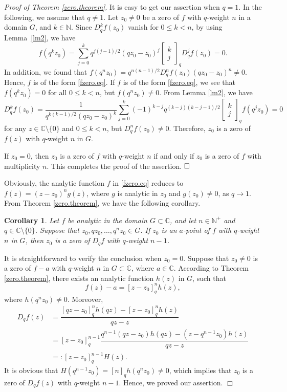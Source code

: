 \documentclass[a4paper,12pt]{article}
\newcommand{\C}{\mathbb{C}}
\newcommand{\N}{\mathbb{N}}
\newtheorem{corollary}[defin]{Corollary}
\newenvironment{proof}
{\noindent{\it Proof.}}{\hfill $\Box$\par\vspace{2.5mm}}
\numberwithin{equation}{section}
\begin{document}
\bigskip
\noindent
\emph{Proof of Theorem \ref{zero.theorem}}.
It is easy to get our assertion when $q=1$. In the following, we assume that $q\neq 1$.
Let $z_0\neq 0$ be a zero of $f$ with $q$-weight $n$ in a domain $G$, and $k\in\N$. Since $D_q^k f(z_0)$ vanish for $0\leq k<n$, by using Lemma~\ref{lm2}, we have
   $$ f(q^kz_0)=\sum_{j=0}^{k} q^{j(j-1)/2}(qz_0-z_0)^j
   \left[\begin{array}{cc}
   k\\j
   \end{array}\right]_q
   D_q^jf(z_0)=0.$$
In addition, we found that $f(q^nz_0)=q^{n(n-1)/2}D_q^nf(z_0)(qz_0-z_0)^n\neq 0$.
Hence, $f$ is of the form \eqref{fzero.eq}.
If $f$ is of the form \eqref{fzero.eq}, we see that $f(q^kz_0)=0$ for all $0\leq k<n$, but
$f(q^nz_0)\neq 0$. From Lemma \ref{lm2}, we have
$$
 D_q^kf(z_0) = \frac{1}{q^{k(k-1)/2}(qz_0-z_0)^k}\sum_{j=0}^k (-1)^{k-j}q^{(k-j)(k-j-1)/2}
	\left[\begin{array}{cc}
	k\\j
	\end{array}\right]_q
	f(q^jz_0)=0
$$
for any $z \in\C\setminus\{0\}$ and $0\leq k<n$, but $D_q^nf(z_0)\neq 0$. Therefore,
$z_0$ is a zero of $f(z)$ with $q$-weight $n$ in $G$.

If $z_0=0$, then $z_0$ is a zero of $f$ with $q$-weight $n$ if and only if $z_0$ is a zero of $f$ with multiplicity $n$. This completes the proof of the assertion. $\hfill\square$

\bigskip
\noindent

Obviously, the analytic function $f$ in \eqref{fzero.eq} reduces to $f(z)=(z-z_0)^ng(z)$, where $g$ is analytic in $z_0$ and $g(z_0)\neq 0$, as $q\to 1$.
From Theorem \ref{zero.theorem}, we have the following corollary.

\begin{corollary}\label{n-1.cor}
Let $f$ be analytic in the domain $G\subset\C$, and let $n\in\N^+$ and $q\in\C\setminus\{0\}$. Suppose that $z_0, qz_0,\ldots, q^nz_0\in G$.
If $z_0$ is an $a$-point of $f$ with $q$-weight $n$ in $G$, then $z_0$ is a zero of $D_q f$ with $q$-weight $n-1$.
\end{corollary}
\begin{proof}
It is straightforward to verify the conclusion when $z_0=0$.
Suppose that $z_0\neq 0$ is a zero of $f-a$ with $q$-weight $n$ in $G\subset\C$, where $a\in\C$. According to Theorem \ref{zero.theorem}, there exists an analytic function $h(z)$ in $G$, such that
$$
f(z)-a=[z-z_0]_q^nh(z),
$$
where $h(q^nz_0)\ne0$. Moreover,
\begin{align*}\nonumber
     D_qf(z) &= \dfrac{[qz-z_0]_q^n h(qz)-[z-z_0]_q^nh(z)}{qz-z} \\
             &= [z-z_0]_q^{n-1}\dfrac{q^{n-1}(qz-z_0)h(qz)-(z-q^{n-1}z_0)h(z)}{qz-z}\\
             &=: [z-z_0]_q^{n-1}H(z).
\end{align*}
It is obvious that $ H(q^{n-1}z_0)= [n]_qh(q^nz_0)\neq 0 $, which implies that $z_0$ is a zero of $D_qf(z)$ with $q$-weight $n-1$. Hence, we proved our assertion.
\end{proof}
\end{document}
